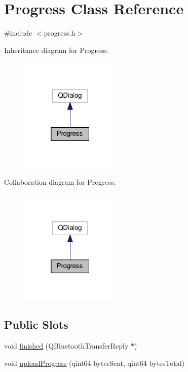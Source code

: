 \hypertarget{classProgress}{}\section{Progress Class Reference}
\label{classProgress}


{\ttfamily \#include $<$progress.\+h$>$}



Inheritance diagram for Progress\+:\nopagebreak
\begin{figure}[H]
\begin{center}
\leavevmode
\includegraphics[width=136pt]{classProgress__inherit__graph}
\end{center}
\end{figure}


Collaboration diagram for Progress\+:\nopagebreak
\begin{figure}[H]
\begin{center}
\leavevmode
\includegraphics[width=136pt]{classProgress__coll__graph}
\end{center}
\end{figure}
\subsection*{Public Slots}
\begin{DoxyCompactItemize}
\item 
void \hyperlink{classProgress_a15a8bf25ca7faafcc866813f1fd90677}{finished} (Q\+Bluetooth\+Transfer\+Reply $\ast$)
\item 
void \hyperlink{classProgress_ae4b8bbb82b1713a353688fb24ea39864}{upload\+Progress} (qint64 bytes\+Sent, qint64 bytes\+Total)
\end{DoxyCompactItemize}
